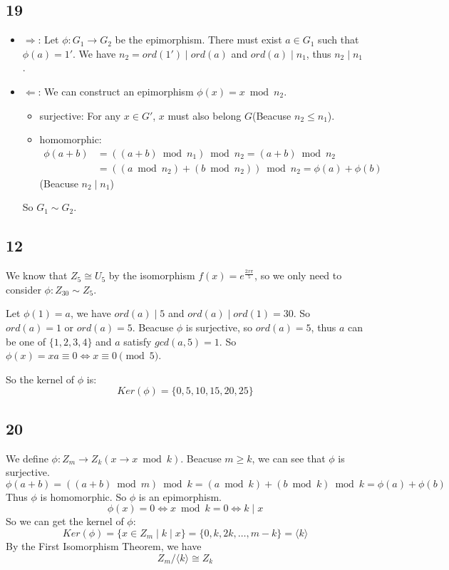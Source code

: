 \documentclass[draft]{article}
\begin{document}
		\subsection*{19}
			\begin{itemize}
				\item $\Rightarrow$:
					Let $\phi:G_1\rightarrow G_2$ be the epimorphism. There must exist $a \in
					G_1$ such that $\phi(a) = 1'$. We have $n_2 = ord(1') \mid ord(a)$ and
					$ord(a) \mid n_1$, thus $n_2 \mid n_1$.
				\item $\Leftarrow$:
					We can construct an epimorphism $\phi(x) = x \bmod n_2$.
					\begin{itemize}
						\item surjective:
							For any $x \in G'$, $x$ must also belong $G$(Beacuse $n_2 \leq
							n_1$).
						\item homomorphic:
							\begin{equation*}
							\begin{split}
								\phi(a+b) &= ((a+b) \bmod n_1) \bmod n_2 = (a + b) \bmod n_2 \\
								          &= ((a \bmod n_2) + (b \bmod n_2)) \bmod n_2 = \phi(a) + \phi(b)
							\end{split}
							\end{equation*}
							(Beacuse $n_2 \mid n_1$)
					\end{itemize}
					So $G_1 \sim G_2$.
			\end{itemize}
		\subsection*{12}
			We know that $Z_5 \cong U_5$ by the isomorphism $f(x) = e^{\frac{2x\pi}{5}}$, so we only
			need to consider $\phi:Z_{30} \sim Z_5$.

			Let $\phi(1) = a$, we have $ord(a) \mid 5$ and $ord(a) \mid ord(1) = 30$.
			So $ord(a) = 1$ or $ord(a) = 5$. Beacuse $\phi$ is surjective, so $ord(a)
			= 5$, thus $a$ can be one of $\{1,2,3,4\}$ and $a$ satisfy $gcd(a,5) = 1$.
			So $\phi(x) = xa \equiv 0 \Leftrightarrow x \equiv 0 \pmod 5$.
			
			So the kernel of $\phi$ is:
			$$
				Ker(\phi) = \{ 0, 5, 10, 15, 20, 25 \}
			$$
			
		\subsection*{20}
			We define $\phi:Z_m \rightarrow Z_k(x \rightarrow x \bmod k)$.
			Beacuse $m \geq k$, we can see that $\phi$ is surjective.
			$$\phi(a+b) = ((a+b) \bmod m) \bmod k = (a \bmod k) + (b \bmod k) \bmod k =
			\phi(a) + \phi(b)$$
			Thus $\phi$ is homomorphic. So $\phi$ is an epimorphism.
			$$
			\phi(x) = 0 \Leftrightarrow x \bmod k = 0 \Leftrightarrow k \mid x
			$$
			So we can get the kernel of $\phi$:
			$$
				Ker(\phi) = \{ x \in Z_m \mid k \mid x \} = \{ 0, k, 2k, \dots,
				m - k\} = \langle k \rangle
			$$
			By the First Isomorphism Theorem, we have
			$$
			Z_m/\langle k \rangle \cong Z_k
			$$
\end{document}
